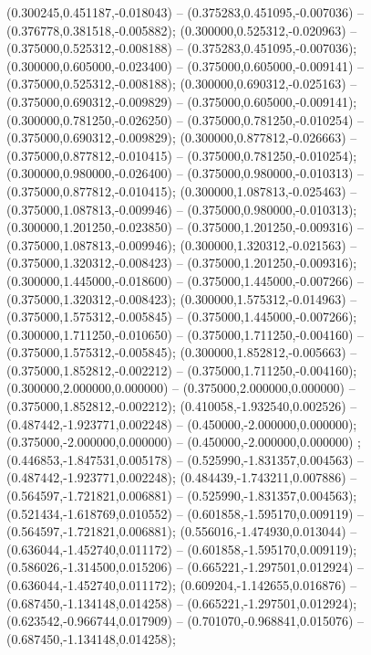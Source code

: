  (0.300245,0.451187,-0.018043) -- (0.375283,0.451095,-0.007036) -- (0.376778,0.381518,-0.005882);
 (0.300000,0.525312,-0.020963) -- (0.375000,0.525312,-0.008188) -- (0.375283,0.451095,-0.007036);
 (0.300000,0.605000,-0.023400) -- (0.375000,0.605000,-0.009141) -- (0.375000,0.525312,-0.008188);
 (0.300000,0.690312,-0.025163) -- (0.375000,0.690312,-0.009829) -- (0.375000,0.605000,-0.009141);
 (0.300000,0.781250,-0.026250) -- (0.375000,0.781250,-0.010254) -- (0.375000,0.690312,-0.009829);
 (0.300000,0.877812,-0.026663) -- (0.375000,0.877812,-0.010415) -- (0.375000,0.781250,-0.010254);
 (0.300000,0.980000,-0.026400) -- (0.375000,0.980000,-0.010313) -- (0.375000,0.877812,-0.010415);
 (0.300000,1.087813,-0.025463) -- (0.375000,1.087813,-0.009946) -- (0.375000,0.980000,-0.010313);
 (0.300000,1.201250,-0.023850) -- (0.375000,1.201250,-0.009316) -- (0.375000,1.087813,-0.009946);
 (0.300000,1.320312,-0.021563) -- (0.375000,1.320312,-0.008423) -- (0.375000,1.201250,-0.009316);
 (0.300000,1.445000,-0.018600) -- (0.375000,1.445000,-0.007266) -- (0.375000,1.320312,-0.008423);
 (0.300000,1.575312,-0.014963) -- (0.375000,1.575312,-0.005845) -- (0.375000,1.445000,-0.007266);
 (0.300000,1.711250,-0.010650) -- (0.375000,1.711250,-0.004160) -- (0.375000,1.575312,-0.005845);
 (0.300000,1.852812,-0.005663) -- (0.375000,1.852812,-0.002212) -- (0.375000,1.711250,-0.004160);
 (0.300000,2.000000,0.000000) -- (0.375000,2.000000,0.000000) -- (0.375000,1.852812,-0.002212);
 (0.410058,-1.932540,0.002526) -- (0.487442,-1.923771,0.002248) -- (0.450000,-2.000000,0.000000);
 (0.375000,-2.000000,0.000000) -- (0.450000,-2.000000,0.000000) ;
 (0.446853,-1.847531,0.005178) -- (0.525990,-1.831357,0.004563) -- (0.487442,-1.923771,0.002248);
 (0.484439,-1.743211,0.007886) -- (0.564597,-1.721821,0.006881) -- (0.525990,-1.831357,0.004563);
 (0.521434,-1.618769,0.010552) -- (0.601858,-1.595170,0.009119) -- (0.564597,-1.721821,0.006881);
 (0.556016,-1.474930,0.013044) -- (0.636044,-1.452740,0.011172) -- (0.601858,-1.595170,0.009119);
 (0.586026,-1.314500,0.015206) -- (0.665221,-1.297501,0.012924) -- (0.636044,-1.452740,0.011172);
 (0.609204,-1.142655,0.016876) -- (0.687450,-1.134148,0.014258) -- (0.665221,-1.297501,0.012924);
 (0.623542,-0.966744,0.017909) -- (0.701070,-0.968841,0.015076) -- (0.687450,-1.134148,0.014258);

